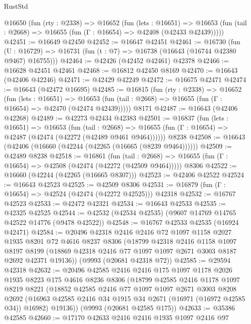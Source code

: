 \begin{lexlean}{RustStd}
\begin{coremodule}
  @16650
    (fun (rty : @2338) =>
    @16652
      (fun (lets : @16651) =>
      @16653 (fun (tail : @2668) => @16655 (fun (Γ : @16654) => @42408 (@42433 @42439)))))
@42451 := @16649 @42450
@42452 := @16647 @42451
@42461 := @16730
    (fun (U : @16729) => @16731 (fun (t : @7) => @16738 (@16643 (@16744 @42380 @9467) @16755)))
@42464 := @42426 (@42452 @42461) @42378
@42466 := @16628 @42451 @42461
@42468 := @16812 @42450 @8169
@42470 := @16643 (@42406 @42246)
@42471 := @42429 @42249
@42472 := @16675 @42471
@42474 := @16643 (@42472 @16695)
@42485 := @16815
    (fun (rty : @2338) =>
    @16652
      (fun (lets : @16651) =>
      @16653 (fun (tail : @2668) => @16655 (fun (Γ : @16654) => @42470 (@42474 @42439)))))
    @8171
@42487 := @16643 (@42406 @42268)
@42489 := @42273 @42434 @42383
@42501 := @16837
    (fun (lets : @16651) =>
    @16653
      (fun (tail : @2668) =>
      @16655 (fun (Γ : @16654) => @42487 (@42474 (@42272 (@42489 @9461 @9464))))))
    @8238
@42508 := @16643 (@42406 (@16660 (@42244 (@42265 (@16665 (@8239 @9464))))))
@42509 := @42489 @8238
@42518 := @16861
    (fun (tail : @2668) => @16655 (fun (Γ : @16654) => @42508 (@42474 (@42272 (@42509 @9464)))))
    @8306
@42522 := @16660 (@42244 (@42265 (@16665 @8307)))
@42523 := @42406 @42522
@42524 := @16643 @42523
@42525 := @42509 @8306
@42531 := @16879 (fun (Γ : @16654) => @42524 (@42474 (@42272 @42525))) @42318
@42532 := @16767 @42523
@42533 := @42472 @42321
@42534 := @16643 @42533
@42535 := @42325 @42525
@42544 := @42532 (@42534 @42535) (@9607 @14769 @14765 @42522 @14776 (@9478 @42522))
@42548 := @16767 @42533 @42535 (@16924 @42471)
@42584 := @20496
    @42318
    @2416
    @2416
    @72
    @1097
    @1158
    @2027
    @1935
    @8201
    @72
    @4616
    @8237
    @8306
    (@18799
      @42318
      @2416
      @1158
      @1097
      @8197
      @8199
      (@18869 @42318 @2416 @77 @1097 @1097 @2671 @3003 @8187 @2692 @42371 @19136))
    (@9993 (@20681 @42318 @72))
@42585 := @29594 @42318
@42632 := @20496
    @42585
    @2416
    @2416
    @175
    @1097
    @1178
    @2026
    @1935
    @8223
    @175
    @4616
    @8236
    @8306
    (@18799
      @42585
      @2416
      @1178
      @1097
      @8219
      @8221
      (@18852
        @42585
        @2416
        @77
        @1097
        @1097
        @2671
        @3003
        @8208
        @2692
        (@16963 @42585 @2416 @34 @1915 @34 @2671 (@16971 (@16972 @42585 @34)) @16982)
        @19136))
    (@9993 (@20681 @42585 @175))
@42633 := @35386 @42585
@42660 := @17170
    @42633
    @2416
    @2416
    @1935
    @1097
    @2416
    @97

\end{coremodule}
\end{lexlean}
